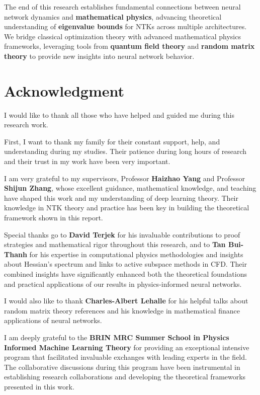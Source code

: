 \documentclass[a4paper]{article}
\theoremstyle{plain}
\theoremstyle{definition}
\theoremstyle{remark}
\begin{document}
The end of this research establishes fundamental connections between neural network dynamics and \textbf{mathematical physics}, advancing theoretical understanding of \textbf{eigenvalue bounds} for NTKs across multiple architectures. We bridge classical optimization theory with advanced mathematical physics frameworks, leveraging tools from \textbf{quantum field theory} and \textbf{random matrix theory} to provide new insights into neural network behavior.

\newpage










\section*{Acknowledgment}

I would like to thank all those who have helped and guided me during this research work.

First, I want to thank my family for their constant support, help, and understanding during my studies. Their patience during long hours of research and their trust in my work have been very important.

I am very grateful to my supervisors, Professor \textbf{Haizhao Yang} and Professor \textbf{Shijun Zhang}, whose excellent guidance, mathematical knowledge, and teaching have shaped this work and my 
understanding of deep learning theory. Their knowledge in NTK theory and practice has been key in building the theoretical framework shown in this report.

Special thanks go to \textbf{David Terjek} for his invaluable contributions to proof strategies and mathematical rigor throughout this research,
 and to \textbf{Tan Bui-Thanh} for his expertise in computational physics methodologies and insights about Hessian's spectrum and links to active subspace methods in CFD.
 Their combined insights have significantly enhanced both the theoretical foundations and practical applications of our
  results in physics-informed neural networks.

I would also like to thank \textbf{Charles-Albert Lehalle} for his helpful talks about random matrix theory references and his knowledge 
in mathematical finance applications of neural networks.

I am deeply grateful to the \textbf{BRIN MRC Summer School in Physics Informed Machine Learning Theory} for providing an 
exceptional intensive program that facilitated invaluable exchanges with leading experts in the field. The collaborative 
discussions during this program have been instrumental in establishing research collaborations and developing the theoretical
 frameworks presented in this work.
\end{document}

